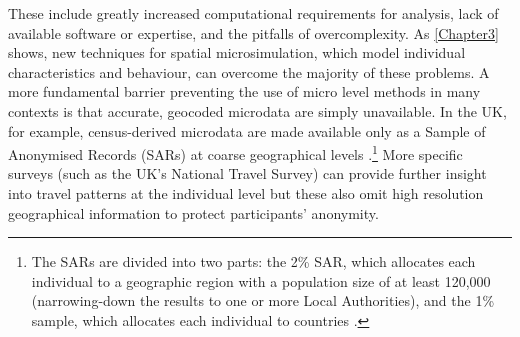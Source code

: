 These include greatly increased computational requirements for
analysis, lack of available software or expertise, and the pitfalls of
overcomplexity. As \cref{Chapter3} shows, new techniques for spatial
microsimulation, which model individual characteristics and behaviour,
can overcome the majority of these problems.
A more fundamental barrier preventing the use of micro level
methods in many contexts is that accurate, geocoded
microdata are simply unavailable. In the UK, for example, census-derived
microdata are made available only as a Sample of Anonymised Records (SARs) at
coarse geographical levels
\citep{Dale2002}.\footnote{The
SARs are divided into two parts: the 2\% SAR, which
allocates each individual to a geographic region with a population
size of at least 120,000 (narrowing-down the results to one or more Local
Authorities), and the 1\% sample, which allocates each individual
to countries \citep{Dale2002}.
}
More specific surveys (such as the UK's National Travel Survey) can provide
further insight into travel patterns at the
individual level but these also omit high resolution geographical
information to protect participants' anonymity.
% 


